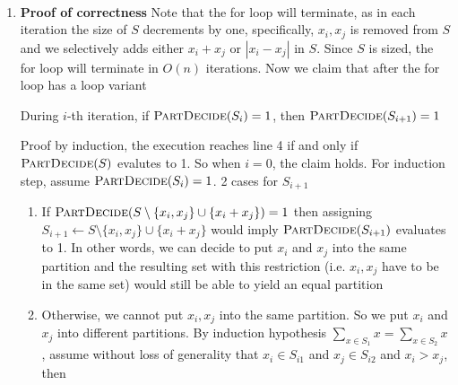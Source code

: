 \documentclass[11pt]{article}
\begin{document}
\begin{enumerate}
\begin{solution}
\begin{algorithm}[H]
{{                    
                }
                \\
            }
        \end{algorithm}
        \begin{enumerate}
            \item \textbf{Proof of correctness} Note that the for loop will terminate, as in each iteration the size of $S$ decrements by one, specifically, $x_i, x_j$ is removed from $S$ and we selectively adds either $x_i + x_j$ or $|x_i - x_j|$ in $S$. Since $S$ is sized, the for loop will terminate in $O(n)$ iterations. Now we claim that after the for loop has a loop variant 
            \begin{center}
                During $i$-th iteration, if $\textsc{PartDecide}(S_i) = 1$, then $\textsc{PartDecide}(S_{i+1}) = 1$
            \end{center}
            Proof by induction, the execution reaches line 4 if and only if $\textsc{PartDecide}(S)$ evalutes to 1. So when $i=0$, the claim holds. For induction step, assume $\textsc{PartDecide}(S_i) = 1$. 2 cases for $S_{i+1}$
            \begin{enumerate}
                \item If $\textsc{PartDecide}(S \setminus \{ x_i, x_j \} \cup \{ x_i + x_j \}) = 1$ then assigning $S_{i+1} \leftarrow S \setminus \{ x_i, x_j \} \cup \{ x_i + x_j \}$ would imply $\textsc{PartDecide}(S_{i+1})$ evaluates to 1. In other words, we can decide to put $x_i$ and $x_j$ into the same partition and the resulting set with this restriction (i.e. $x_i,x_j$ have to be in the same set) would still be able to yield an equal partition
                \item Otherwise, we cannot put $x_i,x_j$ into the same partition. So we put $x_i$ and $x_j$ into different partitions. By induction hypothesis $\sum_{x\in S_1} x = \sum_{x\in S_2} x $, assume without loss of generality that $x_i \in S_{i1}$ and $x_j \in S_{i2}$ and $x_i > x_j$, then 

\end{enumerate}
\end{enumerate}
\end{solution}
\end{enumerate}
\end{document}
